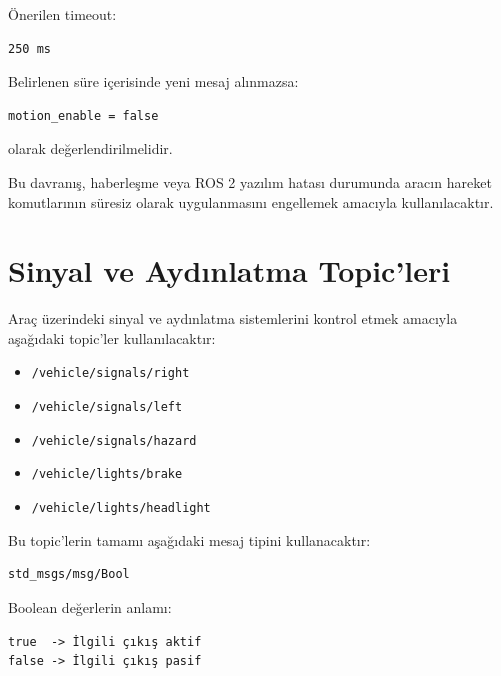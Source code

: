 \documentclass[12pt,a4paper]{article}
\begin{document}
Önerilen timeout:

\begin{verbatim}
250 ms
\end{verbatim}

Belirlenen süre içerisinde yeni mesaj alınmazsa:

\begin{verbatim}
motion_enable = false
\end{verbatim}

olarak değerlendirilmelidir.

Bu davranış, haberleşme veya ROS 2 yazılım hatası durumunda aracın
hareket komutlarının süresiz olarak uygulanmasını engellemek amacıyla
kullanılacaktır.

\section{Sinyal ve Aydınlatma Topic'leri}

Araç üzerindeki sinyal ve aydınlatma sistemlerini kontrol etmek amacıyla
aşağıdaki topic'ler kullanılacaktır:

\begin{itemize}

    \item \texttt{/vehicle/signals/right}

    \item \texttt{/vehicle/signals/left}

    \item \texttt{/vehicle/signals/hazard}

    \item \texttt{/vehicle/lights/brake}

    \item \texttt{/vehicle/lights/headlight}

\end{itemize}

Bu topic'lerin tamamı aşağıdaki mesaj tipini kullanacaktır:

\begin{verbatim}
std_msgs/msg/Bool
\end{verbatim}

Boolean değerlerin anlamı:

\begin{verbatim}
true  -> İlgili çıkış aktif
false -> İlgili çıkış pasif
\end{verbatim}
\end{document}

